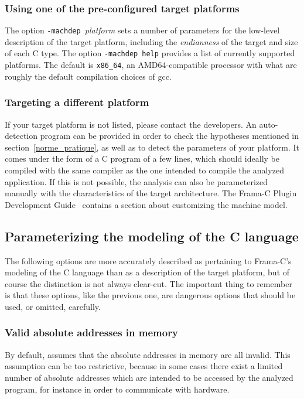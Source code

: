 \documentclass{frama-c-book}
\begin{document}
\subsubsection{Using one of the pre-configured target platforms}

The option \lstinline|-machdep |{\it platform}
sets a number of parameters for the low-level description of the
target platform, including the
\emph{endianness} of the target and size of each C type.
The option \lstinline|-machdep help| provides a list of currently supported
platforms. The default is \lstinline|x86_64|, an AMD64-compatible processor with
what are roughly the default compilation choices of gcc.

\subsubsection{Targeting a different platform}

If your target platform  is not listed,
please contact the developers.
An auto-detection program can be provided in order to check the hypotheses
mentioned in section~\ref{norme_pratique}, as well as to detect the
parameters of your platform.
It comes under the form of a C program of a few lines, which should ideally be
compiled with the same compiler as the one intended to compile the
analyzed application. If this is not possible, the analysis can also be
parameterized manually with the characteristics of the target
architecture.
The Frama-C Plugin Development Guide~\cite{plugin-dev-guide} contains a
section about customizing the machine model.

\subsection{Parameterizing the modeling of the C language}

The following options are more accurately described as
pertaining to Frama-C's modeling of the C language
than as a description of the target platform, but of course
the distinction is not always clear-cut. The important thing to remember
is that these options, like the previous one, are dangerous options
that should be used, or omitted, carefully.

\subsubsection{Valid absolute addresses in memory}

By default, \Eva{} assumes that the absolute addresses in
memory are all invalid. This assumption can be too restrictive,
because in some cases there exist a limited number of absolute
addresses which are intended to be accessed by the analyzed program,
for instance in order to communicate with hardware.
\end{document}
